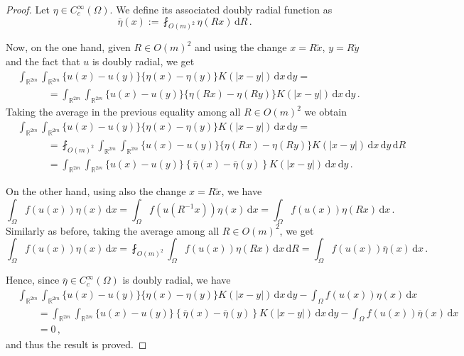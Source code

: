 \documentclass[12pt,reqno]{amsart}
\theoremstyle{definition}
\theoremstyle{remark}
\newcommand{\con}[1]{\mathbb{#1}}
\newcommand{\R}{\con{R}} %
\renewcommand{\d}{\,\mathrm{d}} %
\newcommand{\average}{\fint}
\numberwithin{equation}{section}
\begin{document}
\begin{proof}
	Let $\eta \in C^\infty_c(\Omega)$. We define its associated doubly radial function as
	$$
	\overline{\eta}(x) := \average_{O(m)^2}\eta(R x)\d R\,.
	$$
	
	Now, on the one hand, given $R\in O(m)^2$ and using the change $x = R\tilde{x}$, $y = R \tilde{y}$ and the fact that $u$ is doubly radial, we get
	\begin{align*}
	&\int_{\R^{2m}}\int_{\R^{2m}} \{u(x)-u(y)\}\{\eta(x)-\eta(y)\} K(|x-y|) \d x \d y = \\
	&\quad \quad \quad = \int_{\R^{2m}}\int_{\R^{2m}} \{u(x)-u(y)\}\{\eta(R x)-\eta(R y)\} K(|x-y|) \d x \d y\,.
	\end{align*}
	Taking the average in the previous equality among all $R\in O(m)^2$ we obtain
	\begin{align*}
	& \int_{\R^{2m}}\int_{\R^{2m}} \{u(x)-u(y)\}\{\eta(x)-\eta(y)\} K(|x-y|) \d x \d y = \\
	&\quad \quad \quad =\average_{O(m)^2} \int_{\R^{2m}}\int_{\R^{2m}} \{u(x)-u(y)\}\{\eta(R x)-\eta(R y)\} K(|x-y|) \d x \d y \d R \\
	&\quad \quad \quad= \int_{\R^{2m}}\int_{\R^{2m}} \{u(x)-u(y)\}\left \{\overline{\eta}(x) -\overline{\eta}(y)  \right \} K(|x-y|) \d x \d y \,.
	\end{align*}
	
	On the other hand, using also the change $x = R\tilde{x}$, we have
	$$
	\int_{\Omega} f(u(x)) \eta(x) \d x = \int_{\Omega} f(u(R^{-1}x)) \eta(x) \d x = \int_{\Omega} f(u(x)) \eta(Rx) \d x\,.
	$$
	Similarly as before, taking the average among all $R\in O(m)^2$, we get
	$$
	\int_{\Omega} f(u(x)) \eta(x) \d x = \average_{O(m)^2} \int_{\Omega} f(u(x)) \eta(Rx) \d x \d R = \int_{\Omega} f(u(x))\overline{\eta}(x) \d x\,.
	$$
	
	Hence, since $\overline{\eta} \in C^\infty_c(\Omega)$ is doubly radial, we have
	\begin{align*}
	&\int_{\R^{2m}}\int_{\R^{2m}} \{u(x)-u(y)\}\{\eta(x)-\eta(y)\} K(|x-y|) \d x \d y - \int_{\Omega} f(u(x)) \eta(x) \d x \\
	&\quad \quad= \int_{\R^{2m}}\int_{\R^{2m}} \{u(x)-u(y)\}\left \{\overline{\eta}(x) -\overline{\eta}(y)  \right \} K(|x-y|) \d x \d y - \int_{\Omega} f(u(x))\overline{\eta}(x) \d x \\
	&\quad \quad= 0\,,
	\end{align*}
	and thus the result is proved.
\end{proof}
\end{document}
